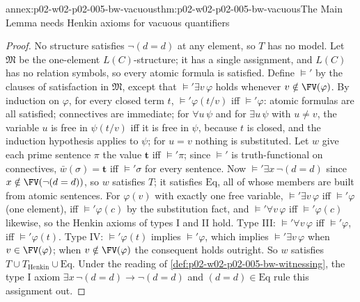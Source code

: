 \begin{annexitem}{annex:p02-w02-p02-005-bw-vacuous}{thm:p02-w02-p02-005-bw-vacuous}{The Main Lemma needs Henkin axioms for vacuous quantifiers}
\begin{proof}
No structure satisfies \(\neg(d=d)\) at any element, so \(T\) has no model.
Let \(\mathfrak M\) be the one-element \(L(C)\)-structure; it has a single
assignment, and \(L(C)\) has no relation symbols, so every atomic formula
is satisfied.  Define \(\models'\) by the clauses of satisfaction in
\(\mathfrak M\), except that \(\models'\exists v\,\varphi\) holds whenever
\(v\notin\FV(\varphi)\).  By induction on \(\varphi\), for every closed
term \(t\), \(\models'\varphi(t/v)\) iff \(\models'\varphi\): atomic
formulas are all satisfied; connectives are immediate; for
\(\forall u\,\psi\) and for \(\exists u\,\psi\) with \(u\neq v\), the
variable \(u\) is free in \(\psi(t/v)\) iff it is free in \(\psi\), because
\(t\) is closed, and the induction hypothesis applies to \(\psi\); for
\(u=v\) nothing is substituted.  Let \(w\) give each prime sentence
\(\pi\) the value \(\mathbf t\) iff \(\models'\pi\); since \(\models'\) is
truth-functional on connectives, \(\bar w(\sigma)=\mathbf t\) iff
\(\models'\sigma\) for every sentence.  Now \(\models'\exists x\,\neg(d=d)\)
since \(x\notin\FV(\neg(d=d))\), so \(w\) satisfies \(T\); it satisfies
\(\mathrm{Eq}\), all of whose members are built from atomic sentences.  For
\(\varphi(v)\) with exactly one free variable, \(\models'\exists v\,\varphi\)
iff \(\models'\varphi\) (one element), iff \(\models'\varphi(c)\) by the
substitution fact, and \(\models'\forall v\,\varphi\) iff
\(\models'\varphi(c)\) likewise, so the Henkin axioms of types I and II
hold.  Type III: \(\models'\forall v\,\varphi\) iff \(\models'\varphi\), iff
\(\models'\varphi(t)\).  Type IV: \(\models'\varphi(t)\) implies
\(\models'\varphi\), which implies \(\models'\exists v\,\varphi\) when
\(v\in\FV(\varphi)\); when \(v\notin\FV(\varphi)\) the consequent holds
outright.  So \(w\) satisfies \(T\cup T_{\mathrm{Henkin}}\cup\mathrm{Eq}\).
Under the reading of \cref{def:p02-w02-p02-005-bw-witnessing}, the type I
axiom \(\exists x\,\neg(d=d)\to\neg(d=d)\) and \((d=d)\in\mathrm{Eq}\) rule
this assignment out.
\end{proof}
\end{annexitem}

